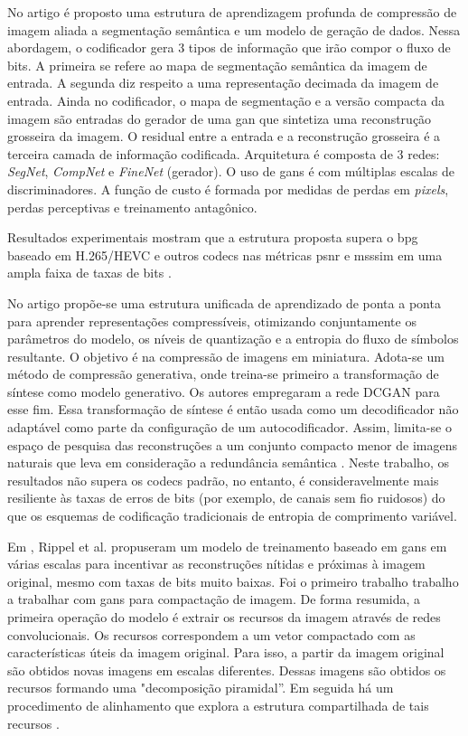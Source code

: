 No artigo \cite{akbari2019dsslic} é proposto uma estrutura de aprendizagem profunda de compressão de imagem aliada a segmentação semântica e um modelo de geração de dados. 
Nessa abordagem, o codificador gera 3 tipos de informação que irão compor o fluxo de bits. A primeira se refere ao mapa de segmentação semântica da imagem de entrada. A segunda diz respeito a uma representação decimada da imagem de entrada. Ainda no codificador, o mapa de segmentação e a versão compacta da imagem são entradas do gerador de uma \acrshort{gan} que sintetiza uma reconstrução grosseira da imagem. O residual entre a entrada e a reconstrução grosseira é a terceira camada de informação codificada. Arquitetura é composta de 3 redes: \textit{SegNet}, \textit{CompNet} e \textit{FineNet} (gerador). O uso de \acrshort{gan}s é com múltiplas escalas de discriminadores. 
A função de custo é formada por medidas de perdas em \textit{pixels}, perdas perceptivas e treinamento antagônico.

Resultados experimentais mostram que a estrutura proposta supera o \acrshort{bpg} baseado em H.265/HEVC e outros \acrshort{codec}s nas métricas \acrshort{psnr} e \acrshort{msssim} em uma ampla faixa de taxas de bits  \cite{akbari2019dsslic}.


No artigo \cite{santurkar2018generative} propõe-se uma estrutura unificada de aprendizado de ponta a ponta para aprender representações compressíveis, otimizando conjuntamente os parâmetros do modelo, os níveis de quantização e a entropia do fluxo de símbolos resultante. O objetivo é na compressão de imagens em miniatura.
Adota-se um método de compressão generativa, onde treina-se primeiro a transformação de síntese como modelo generativo. Os autores empregaram a rede DCGAN \cite{radford2015unsupervised} para esse fim. Essa transformação de síntese é então usada como um decodificador não adaptável como parte da configuração de um autocodificador. Assim, limita-se o espaço de pesquisa das reconstruções a um conjunto compacto menor de imagens naturais que leva em consideração a redundância semântica \cite{santurkar2018generative}. 
Neste trabalho, os resultados não supera os \acrshort{codec}s padrão, no entanto, é consideravelmente mais resiliente às taxas de erros de bits (por exemplo, de canais sem fio ruidosos) do que os esquemas de codificação tradicionais de entropia de comprimento variável.


Em \cite{GAN2017Rippel}, Rippel et al. propuseram um modelo de treinamento baseado em \acrshort{gan}s em várias escalas para incentivar as reconstruções nítidas e próximas à imagem original, mesmo com taxas de bits muito baixas. Foi o primeiro trabalho trabalho a trabalhar com \acrshort{gan}s para compactação de imagem. 
De forma resumida, a primeira operação do modelo é extrair os recursos da imagem através de redes convolucionais. Os recursos correspondem a um vetor compactado com as características úteis da imagem original. Para isso, a partir da imagem original são obtidos novas imagens em escalas diferentes. Dessas imagens são obtidos os recursos formando uma  "decomposição piramidal''. Em seguida há um procedimento de alinhamento que explora a estrutura compartilhada de tais recursos \cite{GAN2017Rippel}.  

